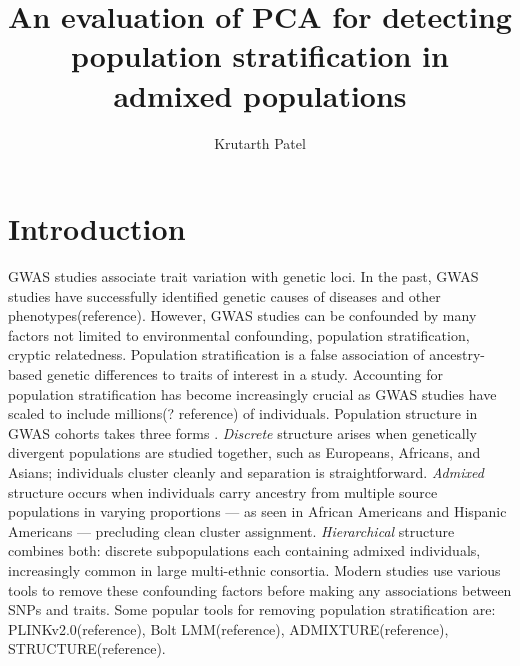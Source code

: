 \documentclass[unnumsec,webpdf,contemporary,large]{oup-authoring-template}
\theoremstyle{thmstyleone}
\theoremstyle{thmstyletwo}
\theoremstyle{thmstylethree}
\begin{document}


\title[Stress testing PCA]{An evaluation of PCA for detecting population stratification in admixed populations}

\author[]{Krutarth Patel}

\address[]{}



\maketitle

\section{Introduction}
GWAS studies associate trait variation with genetic loci. In the past, GWAS studies have successfully identified genetic causes of diseases and other phenotypes(reference). However, GWAS studies can be confounded by many factors not limited to environmental confounding, population stratification, cryptic relatedness. Population stratification is a false association of ancestry-based genetic differences to traits of interest in a study. Accounting for population stratification has become increasingly crucial as GWAS studies have scaled to include millions(? reference) of individuals. Population structure in GWAS cohorts takes three forms \citep{Li2010}. \textit{Discrete} structure arises when genetically divergent populations are studied together, such as Europeans, Africans, and Asians; individuals cluster cleanly and separation is straightforward. \textit{Admixed} structure occurs when individuals carry ancestry from multiple source populations in varying proportions — as seen in African Americans and Hispanic Americans — precluding clean cluster assignment. \textit{Hierarchical} structure combines both: discrete subpopulations each containing admixed individuals, increasingly common in large multi-ethnic consortia.
Modern studies use various tools to remove these confounding factors before making any associations between SNPs and traits. Some popular tools for removing population stratification are: PLINKv2.0(reference), Bolt LMM(reference), ADMIXTURE(reference), STRUCTURE(reference).
\end{document}
